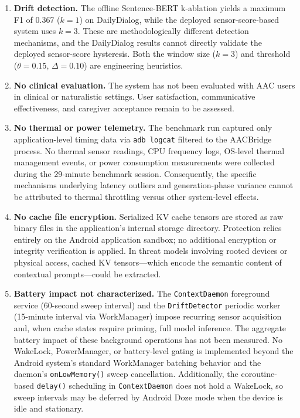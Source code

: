 \documentclass[journal]{IEEEtran}
\begin{document}
\begin{enumerate}
    \item \textbf{Drift detection.} The offline Sentence-BERT k-ablation yields a maximum F1 of 0.367 ($k = 1$) on DailyDialog, while the deployed sensor-score-based system uses $k = 3$. These are methodologically different detection mechanisms, and the DailyDialog results cannot directly validate the deployed sensor-score hysteresis. Both the window size ($k = 3$) and threshold ($\theta = 0.15$, $\Delta = 0.10$) are engineering heuristics.

    \item \textbf{No clinical evaluation.} The system has not been evaluated with AAC users in clinical or naturalistic settings. User satisfaction, communicative effectiveness, and caregiver acceptance remain to be assessed.

    \item \textbf{No thermal or power telemetry.} The benchmark run captured only application-level timing data via \texttt{adb logcat} filtered to the AACBridge process. No thermal sensor readings, CPU frequency logs, OS-level thermal management events, or power consumption measurements were collected during the 29-minute benchmark session. Consequently, the specific mechanisms underlying latency outliers and generation-phase variance cannot be attributed to thermal throttling versus other system-level effects.

    \item \textbf{No cache file encryption.} Serialized KV cache tensors are stored as raw binary files in the application's internal storage directory. Protection relies entirely on the Android application sandbox; no additional encryption or integrity verification is applied. In threat models involving rooted devices or physical access, cached KV tensors---which encode the semantic content of contextual prompts---could be extracted.

    \item \textbf{Battery impact not characterized.} The \texttt{ContextDaemon} foreground service (60-second sweep interval) and the \texttt{DriftDetector} periodic worker (15-minute interval via WorkManager) impose recurring sensor acquisition and, when cache states require priming, full model inference. The aggregate battery impact of these background operations has not been measured. No WakeLock, PowerManager, or battery-level gating is implemented beyond the Android system's standard WorkManager batching behavior and the daemon's \texttt{onLowMemory()} sweep cancellation. Additionally, the coroutine-based \texttt{delay()} scheduling in \texttt{ContextDaemon} does not hold a WakeLock, so sweep intervals may be deferred by Android Doze mode when the device is idle and stationary.
\end{enumerate}
\end{document}
